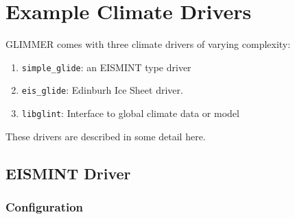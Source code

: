 \section{Example Climate Drivers}
GLIMMER comes with three climate drivers of varying complexity:
\begin{enumerate}
 \item \texttt{simple\_glide}: an EISMINT type driver
 \item \texttt{eis\_glide}: Edinburh Ice Sheet driver.
 \item \texttt{libglint}: Interface to global climate data or model
\end{enumerate}
These drivers are described in some detail here.

\subsection{EISMINT Driver}\label{driver:eismint}
\subsubsection{Configuration}

